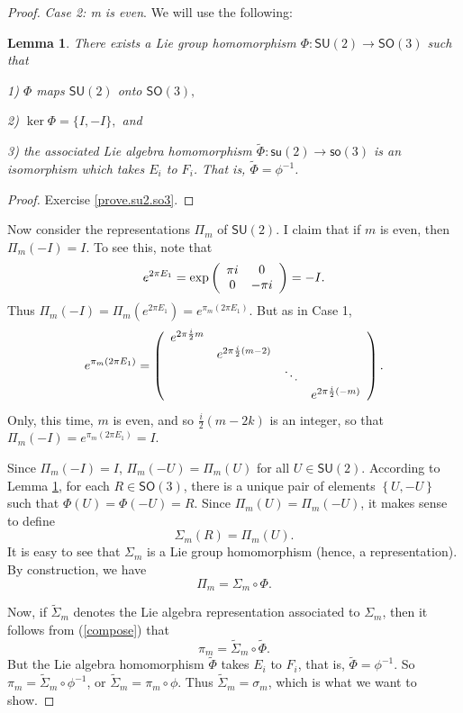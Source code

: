 \documentclass[12pt]{amsbook}
\theoremstyle{plain}
\newtheorem{lemma}[theorem]{Lemma}
\numberwithin{equation}{chapter}
\numberwithin{theorem}{chapter}
\begin{document}
\begin{proof}
\textit{Case 2: m is even}. We will use the following:

\begin{lemma}
\label{su2.so3}There exists a Lie group homomorphism $\Phi:\mathsf{SU}%
(2)\rightarrow\mathsf{SO}(3)$ such that

1) $\Phi$ maps $\mathsf{SU}(2)$ onto $\mathsf{SO}(3),$

2) $\ker\Phi=\{I,-I\},$ and

3) the associated Lie algebra homomorphism $\widetilde{\Phi}:\mathsf{su}%
(2)\rightarrow\mathsf{so}(3)$ is an isomorphism which takes $E_{i}$ to $F_{i}%
$. That is, $\widetilde{\Phi}=\phi^{-1}$.
\end{lemma}

\begin{proof}
Exercise \ref{prove.su2.so3}.
\end{proof}

Now consider the representations $\Pi_{m}$ of $\mathsf{SU}(2)$. I claim that
if $m$ is even, then $\Pi_{m}(-I)=I$. To see this, note that
\[
e^{2\pi E_{1}}=\exp\left(
\begin{array}
[c]{cc}%
\pi i & 0\\
0 & -\pi i
\end{array}
\right)  =-I\text{.}%
\]
Thus $\Pi_{m}(-I)=\Pi_{m}(e^{2\pi E_{1}})=e^{\pi_{m}(2\pi E_{1})}$. But as in
Case 1,
\[
e^{\pi_{m}(2\pi E_{1})}=\left(
\begin{array}
[c]{cccc}%
e^{2\pi\frac{i}{2}m} &  &  & \\
& e^{2\pi\frac{i}{2}(m-2)} &  & \\
&  & \ddots & \\
&  &  &  e^{2\pi\frac{i}{2}(-m)}%
\end{array}
\right)  \text{.}%
\]
Only, this time, $m$ is even, and so $\frac{i}{2}(m-2k)$ is an integer, so
that $\Pi_{m}(-I)=e^{\pi_{m}(2\pi E_{1})}=I$.

Since $\Pi_{m}(-I)=I$, $\Pi_{m}(-U)=\Pi_{m}(U)$ for all $U\in\mathsf{SU}(2)$.
According to Lemma \ref{su2.so3}, for each $R\in\mathsf{SO}(3)$, there is a
unique pair of elements $\left\{  U,-U\right\}  $ such that $\Phi
(U)=\Phi(-U)=R$. Since $\Pi_{m}(U)=\Pi_{m}(-U)$, it makes sense to define
\[
\Sigma_{m}(R)=\Pi_{m}(U)\text{.}%
\]
It is easy to see that $\Sigma_{m}$ is a Lie group homomorphism (hence, a
representation). By construction, we have
\begin{equation}
\Pi_{m}=\Sigma_{m}\circ\Phi\text{.}\label{compose}%
\end{equation}

Now, if $\widetilde{\Sigma}_{m}$ denotes the Lie algebra representation
associated to $\Sigma_{m}$, then it follows from (\ref{compose}) that
\[
\pi_{m}=\widetilde{\Sigma}_{m}\circ\widetilde{\Phi}\text{.}%
\]
But the Lie algebra homomorphism $\widetilde{\Phi}$ takes $E_{i}$ to $F_{i}$,
that is, $\widetilde{\Phi}=\phi^{-1}$. So $\pi_{m}=\widetilde{\Sigma}_{m}%
\circ\phi^{-1}$, or $\widetilde{\Sigma}_{m}=\pi_{m}\circ\phi$. Thus
$\widetilde{\Sigma}_{m}=\sigma_{m}$, which is what we want to show.
\end{proof}
\end{document}
